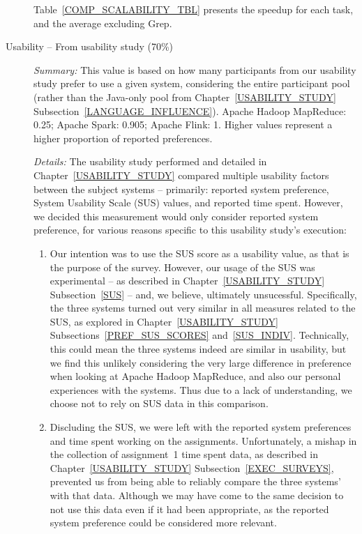 \begin{description}
      Table~\ref{COMP_SCALABILITY_TBL} presents the speedup for each task, and the average excluding Grep.

    \item[Usability -- From usability study (70\%)]
      \textit{Summary:} This value is based on how many participants from our usability study prefer to use a given system, considering the entire participant pool (rather than the Java-only pool from Chapter~\ref{USABILITY_STUDY} Subsection~\ref{LANGUAGE_INFLUENCE}). Apache Hadoop MapReduce: 0.25; Apache Spark: 0.905; Apache Flink: 1. Higher values represent a higher proportion of reported preferences.\medskip

      \textit{Details:} The usability study performed and detailed in Chapter~\ref{USABILITY_STUDY} compared multiple usability factors between the subject systems -- primarily: reported system preference, System Usability Scale (SUS) values, and reported time spent. However, we decided this measurement would only consider reported system preference, for various reasons specific to this usability study's execution:

      \begin{enumerate}
        \item Our intention was to use the SUS score as a usability value, as that is the purpose of the survey. However, our usage of the SUS was experimental -- as described in Chapter~\ref{USABILITY_STUDY} Subsection~\ref{SUS} -- and, we believe, ultimately unsucessful. Specifically, the three systems turned out very similar in all measures related to the SUS, as explored in Chapter~\ref{USABILITY_STUDY} Subsections~\ref{PREF_SUS_SCORES} and~\ref{SUS_INDIV}. Technically, this could mean the three systems indeed are similar in usability, but we find this unlikely considering the very large difference in preference when looking at Apache Hadoop MapReduce, and also our personal experiences with the systems. Thus due to a lack of understanding, we choose not to rely on SUS data in this comparison.
        \item Discluding the SUS, we were left with the reported system preferences and time spent working on the assignments. Unfortunately, a mishap in the collection of assignment~1 time spent data, as described in Chapter~\ref{USABILITY_STUDY} Subsection~\ref{EXEC_SURVEYS}, prevented us from being able to reliably compare the three systems' with that data. Although we may have come to the same decision to not use this data even if it had been appropriate, as the reported system preference could be considered more relevant.
      \end{enumerate}


\end{description}
